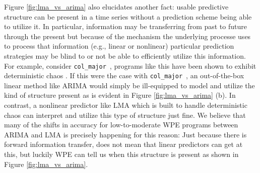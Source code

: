 \documentclass{article}
\newcommand{\col}{{\tt col\_major}~}
\begin{document}





Figure \ref{fig:lma_vs_arima} also elucidates another fact: usable predictive structure can be present in a time series without a prediction scheme being able to utilize it. In particular, information may be transferring from past to future through the present but because of the mechanism the underlying processe uses to process that information  (e.g., linear or nonlinear) particular prediction strategies may be blind to or not be able to efficiently utilize this information. For example, consider \col, programs like this have been shown to exhibit deterministic chaos \cite{mytkowicz09}. If this were the case with \col, an out-of-the-box linear method like ARIMA would simply be ill-equipped to model and utilize the kind of structure present as is evident in Figure \ref{fig:lma_vs_arima} (b). In contrast, a nonlinear predictor like LMA which is built to handle deterministic chaos can interpret and utilize this type of structure just fine. We believe that many of the shifts in accuracy for low-to-moderate WPE programs between ARIMA and LMA is precisely happening for this reason: Just because there is forward information transfer, does not mean that linear predictors can get at this, but luckily WPE can tell us when this structure is present as shown in Figure \ref{fig:lma_vs_arima}.



 

\end{document}

